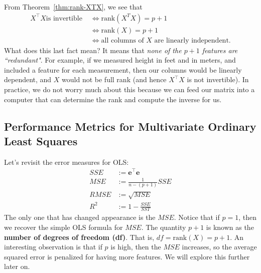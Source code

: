 \documentclass[12pt, a4paper]{article}
\theoremstyle{definition}
\begin{document}
	From Theorem~\ref{thm:rank-XTX}, we see that
	\begin{align*}
		X^\top X\text{is invertible } &\iff \text{rank}(X^TX)=p+1\\
		&\iff \text{rank}(X)=p+1\\
		&\iff \text{all columns of $X$ are linearly independent.}
	\end{align*}
	What does this last fact mean? It means that \textit{none of the $p+1$ features are ``redundant"}.
	For example, if we measured height in feet and in meters, and included a feature for each
	measurement, then our columns would be linearly dependent, and $X$ would not be full rank
	(and hence $X^\top X$ is not invertible). In practice, we do not worry much about this because
	we can feed our matrix into a computer that can determine the rank and compute the inverse for us.
	
	\subsection*{Performance Metrics for Multivariate Ordinary Least Squares}
	Let's revisit the error measures for OLS:
	\begin{align*}
		SSE &:= \mathbf{e}^\top \mathbf{e}\\
		MSE &:= \frac{1}{n-(p+1)}SSE\\
		RMSE &:= \sqrt{MSE}\\
		R^2 &:= 1 - \frac{SSE}{SST}
	\end{align*}
	The only one that has changed appearance is the $MSE$. Notice that if $p=1$, then
	we recover the simple OLS formula for $MSE$. The quantity $p+1$ is known as
	the \textbf{number of degrees of freedom (df)}. That is, $df = \text{rank}(X)=p+1$.
	An interesting observation is that if $p$ is high, then the $MSE$ increases, so the
	average squared error is penalized for having more features. We will explore this
	further later on.
\end{document}
